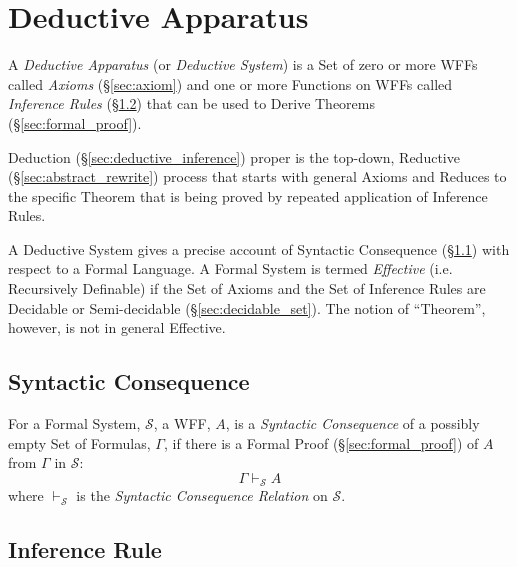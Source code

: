\section{Deductive Apparatus} \label{sec:deductive_apparatus}

A \emph{Deductive Apparatus} (or \emph{Deductive System}) is a Set of
zero or more WFFs called \emph{Axioms} (\S\ref{sec:axiom}) and one or
more Functions on WFFs called \emph{Inference Rules}
(\S\ref{sec:inference_rule}) that can be used to Derive Theorems
(\S\ref{sec:formal_proof}).

Deduction (\S\ref{sec:deductive_inference}) proper is the top-down,
Reductive (\S\ref{sec:abstract_rewrite}) process that starts with
general Axioms and Reduces to the specific Theorem that is being
proved by repeated application of Inference Rules.

A Deductive System gives a precise account of Syntactic Consequence
(\S\ref{sec:syntactic_consequence}) with respect to a Formal Language.
A Formal System is termed \emph{Effective} (i.e. Recursively
Definable) if the Set of Axioms and the Set of Inference Rules are
Decidable or Semi-decidable (\S\ref{sec:decidable_set}). The notion of
``Theorem'', however, is not in general Effective.



\subsection{Syntactic Consequence}\label{sec:syntactic_consequence}

For a Formal System, $\mathcal{S}$, a WFF, $A$, is a \emph{Syntactic
  Consequence} of a possibly empty Set of Formulas, $\Gamma$, if there
is a Formal Proof (\S\ref{sec:formal_proof}) of $A$ from $\Gamma$ in
$\mathcal{S}$:
\[
    \Gamma \vdash_{\mathcal{S}} A
\]
where $\vdash_{\mathcal{S}}$ is the \emph{Syntactic Consequence
  Relation} on $\mathcal{S}$.



\subsection{Inference Rule} \label{sec:inference_rule}

